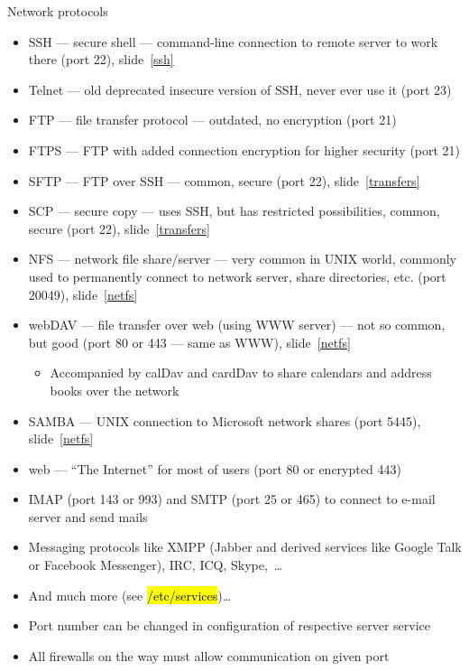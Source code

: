 \documentclass[compress, ucs, xelatex, 11pt, xcolor=svgnames,
  hyperref={
    bookmarks=true,
    unicode=true,
    colorlinks=true,
    pdftitle={Linux, command line and MetaCentrum},
    plainpages=false,
    pdfauthor={Vojtech Zeisek},
    pdfsubject={Course about use of Linux command line, writing shell scripts and using MetaCentrum of CESNET},
    pdfcreator={XeLaTeX},
    pdfkeywords={Linux, GNU, BASH, shell, command line, MetaCentrum},
    linkcolor=DarkRed,
    anchorcolor=DarkBlue,
    citecolor=Indigo,
    filecolor=NavyBlue,
    menucolor=DarkMagenta,
    urlcolor=DarkBlue,
    pdftex},
  url={hyphens, lowtilde} %
  ]{beamer}
\renewcommand{\texttt}[1]{\hl{\ttfamily #1}}
\begin{document}
\begin{frame}[allowframebreaks]{Network protocols}
  \begin{itemize}
    \item SSH --- secure shell --- command-line connection to remote server to work there (port 22), slide~\ref{ssh}
    \item Telnet --- old deprecated insecure version of SSH, never ever use it (port 23)
    \item FTP --- file transfer protocol --- outdated, no encryption (port 21)
    \item FTPS --- FTP with added connection encryption for higher security (port 21)
    \item SFTP --- FTP over SSH --- common, secure (port 22), slide~\ref{transfers}
    \item SCP --- secure copy --- uses SSH, but has restricted possibilities, common, secure (port 22), slide~\ref{transfers}
    \item NFS --- network file share/server --- very common in UNIX world, commonly used to permanently connect to network server, share directories, etc. (port 20049), slide~\ref{netfs}
    \item webDAV --- file transfer over web (using WWW server) --- not so common, but good (port 80 or 443 --- same as WWW), slide~\ref{netfs}
    \begin{itemize}
      \item Accompanied by calDav and cardDav to share calendars and address books over the network
    \end{itemize}
    \item SAMBA --- UNIX connection to Microsoft network shares (port 5445), slide~\ref{netfs}
    \item web --- ``The Internet'' for most of users (port 80 or encrypted 443)
    \item IMAP (port 143 or 993) and SMTP (port 25 or 465) to connect to e-mail server and send mails
    \item Messaging protocols like XMPP (Jabber and derived services like Google Talk or Facebook Messenger), IRC, ICQ, Skype,~\ldots
    \item And much more (see \texttt{/etc/services})\ldots
    \item Port number can be changed in configuration of respective server service
    \item All firewalls on the way must allow communication on given port
  \end{itemize}
\end{frame}
\end{document}
